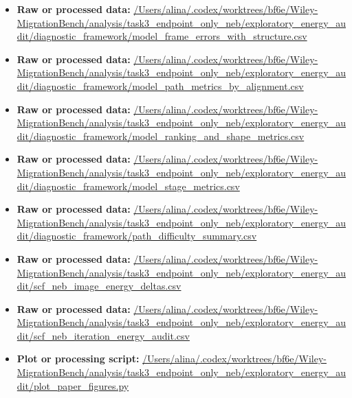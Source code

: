 \begin{itemize}[leftmargin=1.4em,noitemsep]
\item \textbf{Raw or processed data:} \url{/Users/alina/.codex/worktrees/bf6e/Wiley-MigrationBench/analysis/task3_endpoint_only_neb/exploratory_energy_audit/diagnostic_framework/model_frame_errors_with_structure.csv}
\item \textbf{Raw or processed data:} \url{/Users/alina/.codex/worktrees/bf6e/Wiley-MigrationBench/analysis/task3_endpoint_only_neb/exploratory_energy_audit/diagnostic_framework/model_path_metrics_by_alignment.csv}
\item \textbf{Raw or processed data:} \url{/Users/alina/.codex/worktrees/bf6e/Wiley-MigrationBench/analysis/task3_endpoint_only_neb/exploratory_energy_audit/diagnostic_framework/model_ranking_and_shape_metrics.csv}
\item \textbf{Raw or processed data:} \url{/Users/alina/.codex/worktrees/bf6e/Wiley-MigrationBench/analysis/task3_endpoint_only_neb/exploratory_energy_audit/diagnostic_framework/model_stage_metrics.csv}
\item \textbf{Raw or processed data:} \url{/Users/alina/.codex/worktrees/bf6e/Wiley-MigrationBench/analysis/task3_endpoint_only_neb/exploratory_energy_audit/diagnostic_framework/path_difficulty_summary.csv}
\item \textbf{Raw or processed data:} \url{/Users/alina/.codex/worktrees/bf6e/Wiley-MigrationBench/analysis/task3_endpoint_only_neb/exploratory_energy_audit/scf_neb_image_energy_deltas.csv}
\item \textbf{Raw or processed data:} \url{/Users/alina/.codex/worktrees/bf6e/Wiley-MigrationBench/analysis/task3_endpoint_only_neb/exploratory_energy_audit/scf_neb_iteration_energy_audit.csv}
\item \textbf{Plot or processing script:} \url{/Users/alina/.codex/worktrees/bf6e/Wiley-MigrationBench/analysis/task3_endpoint_only_neb/exploratory_energy_audit/plot_paper_figures.py}
\end{itemize}
